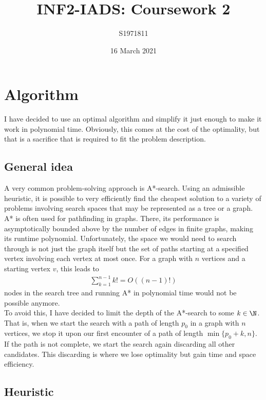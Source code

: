 \documentclass{article}
\title{INF2-IADS: Coursework 2}
\author{S1971811}
\date{16 March 2021}
\begin{document}
\maketitle

\section{Algorithm}

I have decided to use an optimal algorithm and simplify it just enough to make it
work in polynomial time. Obviously, this comes at the cost of the optimality, but
that is a sacrifice that is required to fit the problem description.

\subsection{General idea}

A very common problem-solving approach is A*-search. Using an admissible heuristic,
it is possible to very efficiently find the cheapest solution to a variety of problems
involving search spaces that may be represented as a tree or a graph.
A* is often used for pathfinding in graphs. There, its performance is asymptotically 
bounded above by the number of edges in finite graphs, making its runtime polynomial.
Unfortunately, the space we would need to search through is not just the graph itself
but the set of paths starting at a specified vertex involving each vertex at most once.
For a graph with $n$ vertices and a starting vertex $v$, this leads to
\begin{align*}
    \sum_{k=1}^{n-1} k! = O((n-1)!)
\end{align*}
nodes in the search tree and running A* in polynomial time would not be
possible anymore.\\
To avoid this, I have decided to limit the depth of the A*-search to some $k\in\N$.
That is, when we start the search with a path of length $p_0$ in a graph with $n$
vertices, we stop it upon our first encounter of a path of length $\min\{p_0+k, n\}$.
If the path is not complete, we start the search again discarding all other
candidates. This discarding is where we lose optimality but gain time and space
efficiency.

\subsection{Heuristic}
\end{document}
